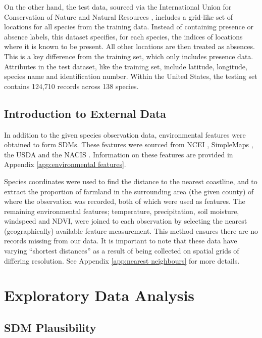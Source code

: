 \documentclass{article}
\begin{document}
On the other hand, the test data, sourced via the International Union for Conservation of Nature and Natural Resources \cite{iucn}, includes a grid-like set of locations for all species from the training data. Instead of containing presence or absence labels, this dataset specifies, for each species, the indices of locations where it is known to be present. All other locations are then treated as absences. This is a key difference from the training set, which only includes presence data. Attributes in the test dataset, like the training set, include latitude, longitude, species name and identification number. Within the United States, the testing set contains 124,710 records across 138 species. \vspace{-0.6em}

\subsection{Introduction to External Data}\vspace{-0.6em}
In addition to the given species observation data, environmental features were obtained to form SDMs. These features were sourced from NCEI \cite{ncei2020}, SimpleMaps \cite{simplemaps2020}, the USDA \cite{usda2022} and the NACIS \cite{nacis2020}. Information on these features are provided in Appendix \ref{app:environmental features}. 

Species coordinates were used to find the distance to the nearest coastline, and to extract the proportion of farmland in the surrounding area (the given county) of where the observation was recorded, both of which were used as features. The remaining environmental features; temperature, precipitation, soil moisture, windspeed and NDVI, were joined to each observation by selecting the nearest (geographically) available feature measurement. This method ensures there are no records missing from our data. It is important to note that these data have varying “shortest distances” as a result of being collected on spatial grids of differing resolution. See Appendix \ref{app:nearest neighbours} for more details.\vspace{-0.4em}

\section{Exploratory Data Analysis}\vspace{-0.4em}

\subsection{SDM Plausibility}\vspace{-0.4em}
\end{document}
